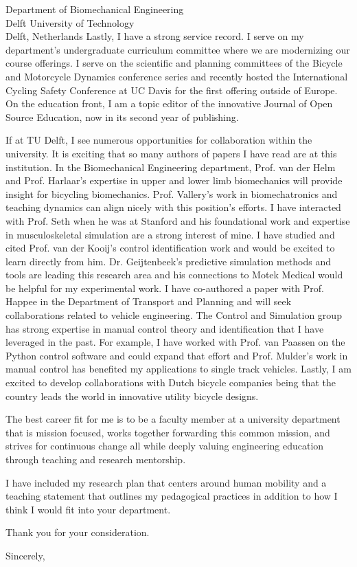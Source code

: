 \documentclass{letter}
\begin{document}
\begin{letter}{
  Department of Biomechanical Engineering \\
  Delft University of Technology \\
  Delft, Netherlands
}
Lastly, I have a strong service record. I serve on my department's
undergraduate curriculum committee where we are modernizing our course
offerings. I serve on the scientific and planning committees of the Bicycle and
Motorcycle Dynamics conference series and recently hosted the International
Cycling Safety Conference at UC Davis for the first offering outside of Europe.
On the education front, I am a topic editor of the innovative Journal of Open
Source Education, now in its second year of publishing.

If at TU Delft, I see numerous opportunities for collaboration within the
university. It is exciting that so many authors of papers I have read are at
this institution. In the Biomechanical Engineering department, Prof.  van der
Helm and Prof. Harlaar's expertise in upper and lower limb biomechanics will
provide insight for bicycling biomechanics. Prof. Vallery's work in
biomechatronics and teaching dynamics can align nicely with this position's
efforts. I have interacted with Prof. Seth when he was at Stanford and his
foundational work and expertise in musculoskeletal simulation are a strong
interest of mine. I have studied and cited Prof. van der Kooij's control
identification work and would be excited to learn directly from him.  Dr.
Geijtenbeek's predictive simulation methods and tools are leading this research
area and  his connections to Motek Medical would be helpful for my experimental
work. I have co-authored a paper with Prof. Happee in the Department of
Transport and Planning and will seek collaborations related to vehicle
engineering. The Control and Simulation group has strong expertise in manual
control theory and identification that I have leveraged in the past. For
example, I have worked with Prof. van Paassen on the Python control software
and could expand that effort and Prof. Mulder's work in manual control has
benefited my applications to single track vehicles. Lastly, I am excited to
develop collaborations with Dutch bicycle companies being that the country
leads the world in innovative utility bicycle designs.

The best career fit for me is to be a faculty member at a university department
that is mission focused, works together forwarding this common mission, and
strives for continuous change all while deeply valuing engineering education
through teaching and research mentorship.


I have included my research plan that centers around human mobility and a
teaching statement that outlines my pedagogical practices in addition to how I
think I would fit into your department.

Thank you for your consideration.

\closing{Sincerely,}

\end{letter}
\end{document}
